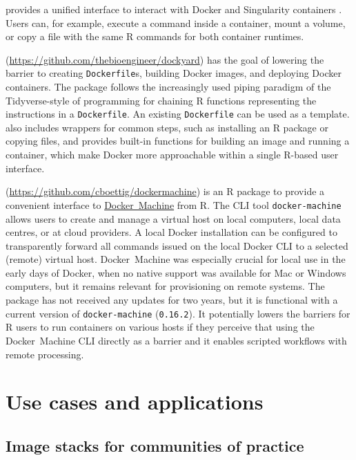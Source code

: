 \textbf{} provides a unified interface to interact
with Docker and Singularity containers \citep{cannoodt_babelwhale_2019}.
Users can, for example, execute a command inside a container, mount a
volume, or copy a file with the same R commands for both container
runtimes.

\textbf{}
(\url{https://github.com/thebioengineer/dockyard}) has the goal of
lowering the barrier to creating \texttt{Dockerfile}s, building Docker
images, and deploying Docker containers. The package follows the
increasingly used piping paradigm of the Tidyverse-style
\citep{wickham_welcome_2019} of programming for chaining R functions
representing the instructions in a \texttt{Dockerfile}. An existing
\texttt{Dockerfile} can be used as a template.  also
includes wrappers for common steps, such as installing an R package or
copying files, and provides built-in functions for building an image and
running a container, which make Docker more approachable within a single
R-based user interface.

\textbf{}
(\url{https://github.com/cboettig/dockermachine}) is an R package to
provide a convenient interface to
\href{https://docs.docker.com/machine/overview/}{Docker~Machine} from R.
The CLI tool \texttt{docker-machine} allows users to create and manage a
virtual host on local computers, local data centres, or at cloud
providers. A local Docker installation can be configured to
transparently forward all commands issued on the local Docker CLI to a
selected (remote) virtual host. Docker~Machine was especially crucial
for local use in the early days of Docker, when no native support was
available for Mac or Windows computers, but it remains relevant for
provisioning on remote systems. The package has not received any updates
for two years, but it is functional with a current version of
\texttt{docker-machine} (\texttt{0.16.2}). It potentially lowers the
barriers for R users to run containers on various hosts if they perceive
that using the Docker~Machine CLI directly as a barrier and it enables
scripted workflows with remote processing.

\hypertarget{use-cases-and-applications}{%
\section{Use cases and applications}\label{use-cases-and-applications}}

\label{applications}

\hypertarget{image-stacks-for-communities-of-practice}{%
\subsection{Image stacks for communities of
practice}\label{image-stacks-for-communities-of-practice}}

